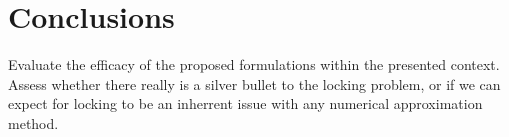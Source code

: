 \chapter{Conclusions}
%
Evaluate the efficacy of the proposed formulations within the presented context. Assess whether there really is a silver bullet to the locking problem, or if we can expect for locking to be an inherrent issue with any numerical approximation method.

